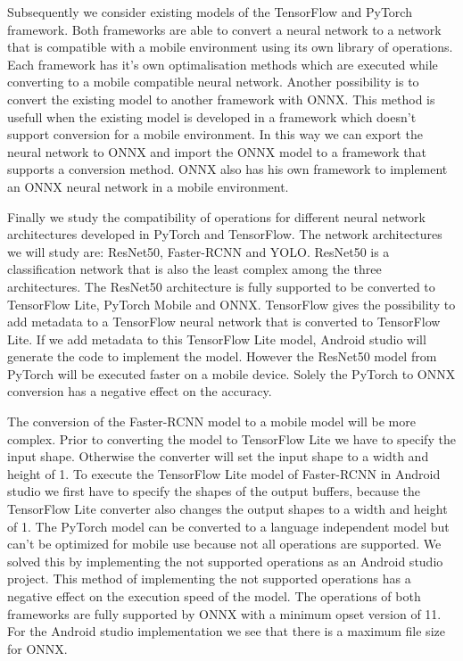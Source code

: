 Subsequently we consider existing models of the TensorFlow and PyTorch framework.
Both frameworks are able to convert a neural network to a network that is compatible with a mobile environment using its own library of operations.
Each framework has it's own optimalisation methods which are executed while converting to a mobile compatible neural network.
Another possibility is to convert the existing model to another framework with ONNX.
This method is usefull when the existing model is developed in a framework which doesn't support conversion for a mobile environment.
In this way we can export the neural network to ONNX and import the ONNX model to a framework that supports a conversion method.
ONNX also has his own framework to implement an ONNX neural network in a mobile environment.

Finally we study the compatibility of operations for different neural network architectures developed in PyTorch and TensorFlow.
The network architectures we will study are: ResNet50, Faster-RCNN and YOLO.
ResNet50 is a classification network that is also the least complex among the three architectures.
The ResNet50 architecture is fully supported to be converted to TensorFlow Lite, PyTorch Mobile and ONNX.
TensorFlow gives the possibility to add metadata to a TensorFlow neural network that is converted to TensorFlow Lite.
If we add metadata to this TensorFlow Lite model, Android studio will generate the code to implement the model.
However the ResNet50 model from PyTorch will be executed faster on a mobile device.
Solely the PyTorch to ONNX conversion has a negative effect on the accuracy.

The conversion of the Faster-RCNN model to a mobile model will be more complex.
Prior to converting the model to TensorFlow Lite we have to specify the input shape.
Otherwise the converter will set the input shape to a width and height of 1.
To execute the TensorFlow Lite model of Faster-RCNN in Android studio we first have to specify the shapes of the output buffers, because the TensorFlow Lite converter also changes the output shapes to a width and height of 1.
The PyTorch model can be converted to a language independent model but can't be optimized for mobile use because not all operations are supported.
We solved this by implementing the not supported operations as an Android studio project.
This method of implementing the not supported operations has a negative effect on the execution speed of the model.
The operations of both frameworks are fully supported by ONNX with a minimum opset version of 11.
For the Android studio implementation we see that there is a maximum file size for ONNX.

